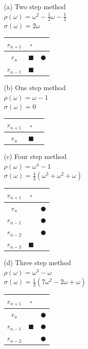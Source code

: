 \documentclass[final,oneside,onecolumn]{article}
\begin{document}
\begin{enumerate}
\bigbreak
	(a) Two step method \\
	$\rho(\omega) = \omega^2 - \frac{1}{2}\omega - \frac{1}{2}$ \\
	$\sigma(\omega) = 2 \omega$ \\
	\begin{tabular}{c|cc}
		$r_{n+1}$ & $\square$ & \\ \hline
		$r_{n}$ & $\blacksquare$ & $\CIRCLE$\\
		$r_{n-1}$ & $\blacksquare$ & \\
	\end{tabular}
\bigbreak
	(b)  One step method \\
	$\rho(\omega) = \omega - 1$ \\
	$\sigma(\omega) = 0$\\
	\begin{tabular}{c|cc}
		$r_{n+1}$ & $\square$ & \\ \hline
		$r_{n}$ & $\blacksquare$ & \\
	\end{tabular}
\bigbreak
	(c) Four step method \\
	$\rho(\omega) = \omega^4 - 1$ \\
	$\sigma(\omega) = \frac{4}{3} ( \omega^3 + \omega^2 + \omega )$\\
	\begin{tabular}{c|cc}
		$r_{n+1}$ & $\square$ &  \\ \hline
		$r_{n}$   & & $\CIRCLE$\\
		$r_{n-1}$ & & $\CIRCLE$\\
		$r_{n-2}$ & & $\CIRCLE$\\
		$r_{n-3}$ & $\blacksquare$ & \\
	\end{tabular}
\bigbreak
	(d) Three step method \\
	$\rho(\omega) = \omega^3 - \omega$ \\
	$\sigma(\omega) = \frac{1}{3} ( 7\omega^2 -2 \omega + \omega )$\\
	\begin{tabular}{c|cc}
		$r_{n+1}$ & $\square$ &  \\ \hline
		$r_{n}$   & & $\CIRCLE$\\
		$r_{n-1}$ & $\blacksquare$ & $\CIRCLE$\\
		$r_{n-2}$ & & $\CIRCLE$ \\
	\end{tabular}
\bigbreak

\end{enumerate}
\end{document}
